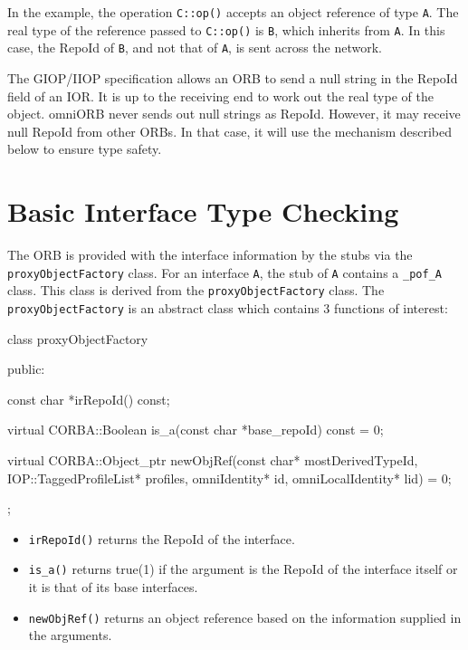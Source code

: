 \documentclass[11pt,twoside,a4paper]{book}
\newcommand{\type}[1]{\texttt{#1}}
\newcommand{\intf}[1]{\texttt{#1}}
\newcommand{\op}[1]{\texttt{#1()}}
\begin{document}
In the example, the operation \op{C::op} accepts an object reference
of type \type{A}. The real type of the reference passed to \op{C::op}
is \type{B}, which inherits from \type{A}. In this case, the RepoId of
\type{B}, and not that of \type{A}, is sent across the network.

The GIOP/IIOP specification allows an ORB to send a null string in the
RepoId field of an IOR. It is up to the receiving end to work out the
real type of the object. omniORB never sends out null strings as
RepoId. However, it may receive null RepoId from other ORBs. In that
case, it will use the mechanism described below to ensure type safety.

\section{Basic Interface Type Checking}
\label{sec_intf}

The ORB is provided with the interface information by the stubs via
the \type{proxyObjectFactory} class. For an interface \intf{A}, the
stub of \intf{A} contains a \type{\_pof\_A} class. This class is
derived from the \type{proxyObjectFactory} class. The
\type{proxyObjectFactory} is an abstract class which contains 3
functions of interest:

\begin{cxxlisting}
class proxyObjectFactory {
public:

  const char *irRepoId() const;

  virtual CORBA::Boolean is_a(const char *base_repoId) const = 0;
       
  virtual CORBA::Object_ptr newObjRef(const char* mostDerivedTypeId,
                                      IOP::TaggedProfileList* profiles,
                                      omniIdentity* id,
                                      omniLocalIdentity* lid) = 0;
};
\end{cxxlisting}

\begin{itemize}
\item \op{irRepoId} returns the RepoId of the interface.
\item \op{is\_a} returns true(1) if the argument is the RepoId of the
interface itself or it is that of its base interfaces.

\item \op{newObjRef} returns an object reference based on the
information supplied in the arguments.
\end{itemize}
\end{document}
